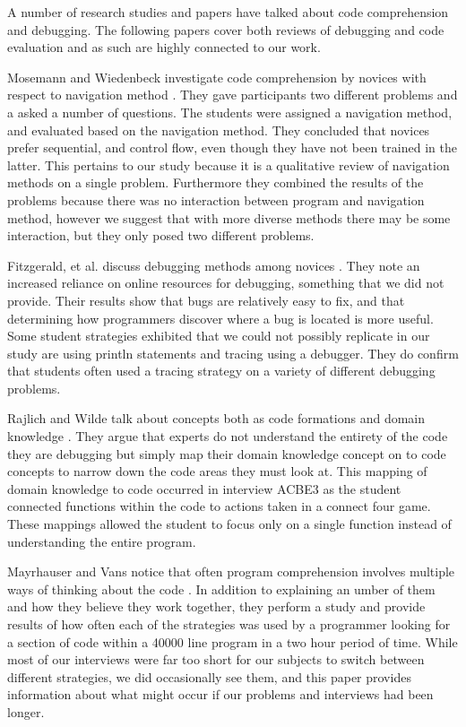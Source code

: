 \documentclass{article}
\begin{document}
A number of research studies and papers have talked about code comprehension and debugging. The following papers cover both reviews of debugging and code evaluation and as such are highly connected to our work. 

Mosemann and Wiedenbeck investigate code comprehension by novices with respect to navigation method \cite{mosemann2001}.
They gave participants two different problems and a asked a number of questions.
The students were assigned a navigation method, and evaluated based on the navigation method.
They concluded that novices prefer sequential, and control flow, even though they have not been trained in the latter.
This pertains to our study because it is a qualitative review of navigation methods on a single problem.
Furthermore they combined the results of the problems because there was no interaction between program and navigation method,
	however we suggest that with more diverse methods there may be some interaction, but they only posed two different problems.
	
Fitzgerald, et al. discuss debugging methods among novices \cite{fitzgerald2008}.
They note an increased reliance on online resources for debugging, something that we did not provide.
Their results show that bugs are relatively easy to fix, and that determining how programmers discover where a bug is located is more useful.
Some student strategies exhibited that we could not possibly replicate in our study are using println statements and tracing using a debugger.
They do confirm that students often used a tracing strategy on a variety of different debugging problems.

Rajlich and Wilde talk about concepts both as code formations and domain knowledge \cite{1021348}.
They argue that experts do not understand the entirety of the code they are debugging but simply map their domain knowledge concept on to code concepts to narrow down the code areas they must look at.
This mapping of domain knowledge to code occurred in interview ACBE3 as the student connected functions within the code to actions taken in a connect four game.
These mappings allowed the student to focus only on a single function instead of understanding the entire program.

Mayrhauser and Vans notice that often program comprehension involves multiple ways of thinking about the code \cite{402076}.
In addition to explaining an umber of them and how they believe they work together,
	they perform a study and provide results of how often each of the strategies was used by a programmer looking for a section of code within a 40000 line program in a two hour period of time.
While most of our interviews were far too short for our subjects to switch between different strategies,
	we did occasionally see them, and this paper provides information about what might occur if our problems and interviews had been longer. 
\end{document}
